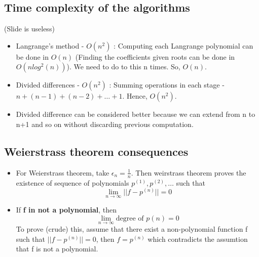 \documentclass{article}
\begin{document}
\subsection{Time complexity of the algorithms}
	(Slide is useless)
	\begin{itemize}
		\item Langrange's method - $O(n^2)$ : Computing each Langrange polynomial can be done in $O(n)$ (Finding the coefficients given roots can be done in \href{https://cs.stackexchange.com/questions/116643/what-is-the-most-efficient-algorithm-to-compute-polynomial-coefficients-from-its}{$O(n log^2(n))$}). We need to do to this n times. So, $O(n)$.
		\item Divided differences - $O(n^2)$ : Summing operations in each stage - $n+(n-1)+ (n-2)+\hdots+ 1$. Hence, $O(n^2)$.
		\item Divided difference can be considered better because we can extend from n to n+1 and so on without discarding previous computation.
	\end{itemize}


\subsection{Weierstrass theorem consequences}
\begin{itemize}
	\item For Weierstrass theorem, take $\epsilon_n = \frac{1}{n}$. Then weirstrass theorem proves the existence of sequence of polynomials $p^{(1)}, p^{(2)}, \hdots$ such that 
		\[\lim_{n\rightarrow \infty} ||f-p^{(n)}||=0\]
	\item If \textbf{f in not a polynomial}, then 
		\[\lim_{n\rightarrow \infty} \text{degree of }p{(n)} = 0\]
		To prove (crude) this, assume that there exist a non-polynomial function f such that $||f-p^{(n)}||=0$, then $f=p^(n)$ which contradicts the assumtion that f is not a polynomial.
\end{itemize}
\end{document}
